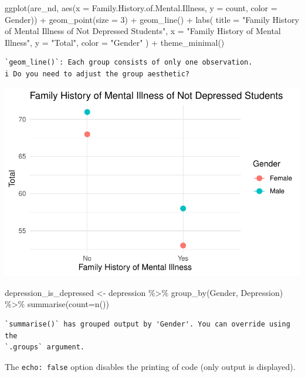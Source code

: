 \documentclass[
  letterpaper,
  DIV=11,
  numbers=noendperiod]{scrartcl}
\newenvironment{Shaded}{\begin{snugshade}}{\end{snugshade}}
\newcommand{\AttributeTok}[1]{\textcolor[rgb]{0.40,0.45,0.13}{#1}}
\newcommand{\DecValTok}[1]{\textcolor[rgb]{0.68,0.00,0.00}{#1}}
\newcommand{\FunctionTok}[1]{\textcolor[rgb]{0.28,0.35,0.67}{#1}}
\newcommand{\NormalTok}[1]{\textcolor[rgb]{0.00,0.23,0.31}{#1}}
\newcommand{\OtherTok}[1]{\textcolor[rgb]{0.00,0.23,0.31}{#1}}
\newcommand{\SpecialCharTok}[1]{\textcolor[rgb]{0.37,0.37,0.37}{#1}}
\newcommand{\StringTok}[1]{\textcolor[rgb]{0.13,0.47,0.30}{#1}}
\begin{document}
\begin{Shaded}
\begin{Highlighting}[]
\FunctionTok{ggplot}\NormalTok{(are\_nd, }\FunctionTok{aes}\NormalTok{(}\AttributeTok{x =}\NormalTok{ Family.History.of.Mental.Illness, }\AttributeTok{y =}\NormalTok{ count, }\AttributeTok{color =}\NormalTok{ Gender)) }\SpecialCharTok{+}
  \FunctionTok{geom\_point}\NormalTok{(}\AttributeTok{size =} \DecValTok{3}\NormalTok{) }\SpecialCharTok{+}    
  \FunctionTok{geom\_line}\NormalTok{() }\SpecialCharTok{+}       
  \FunctionTok{labs}\NormalTok{(}
    \AttributeTok{title =} \StringTok{"Family History of Mental Illness of Not Depressed Students"}\NormalTok{,}
    \AttributeTok{x =} \StringTok{"Family History of Mental Illness"}\NormalTok{,}
    \AttributeTok{y =} \StringTok{"Total"}\NormalTok{,}
    \AttributeTok{color =} \StringTok{"Gender"}
\NormalTok{  ) }\SpecialCharTok{+}
  \FunctionTok{theme\_minimal}\NormalTok{() }
\end{Highlighting}
\end{Shaded}

\begin{verbatim}
`geom_line()`: Each group consists of only one observation.
i Do you need to adjust the group aesthetic?
\end{verbatim}

\includegraphics{Data_files/figure-pdf/unnamed-chunk-11-2.pdf}

\begin{Shaded}
\begin{Highlighting}[]
\NormalTok{depression\_is\_depressed }\OtherTok{\textless{}{-}}\NormalTok{ depression }\SpecialCharTok{\%\textgreater{}\%} \FunctionTok{group\_by}\NormalTok{(Gender, Depression) }\SpecialCharTok{\%\textgreater{}\%} \FunctionTok{summarise}\NormalTok{(}\AttributeTok{count=}\FunctionTok{n}\NormalTok{())}
\end{Highlighting}
\end{Shaded}

\begin{verbatim}
`summarise()` has grouped output by 'Gender'. You can override using the
`.groups` argument.
\end{verbatim}

The \texttt{echo:\ false} option disables the printing of code (only
output is displayed).
\end{document}
